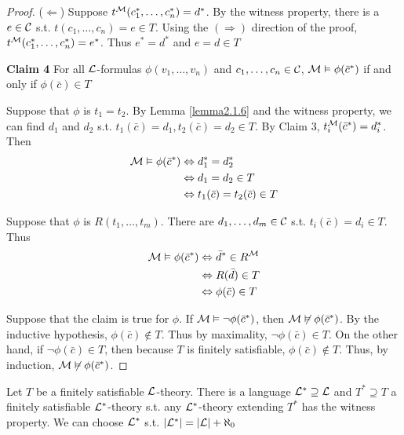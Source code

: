 \documentclass[11pt]{article}
\begin{document}
\begin{proof}
(\(\Leftarrow\)) Suppose \(t^{\mathcal{M}}(c_1^*,\dots,c_n^*)=d^*\). By the witness
property, there is a \(e\in\mathcal{C}\) s.t. \(t(c_1,\dots,c_n)=e\in T\). Using the
\((\Rightarrow)\) direction of the proof, \(t^{\mathcal{M}}(c_1^*,\dots,c_n^*)=e^*\).
Thus \(e^*=d^*\) and \(e=d\in T\)


\textbf{Claim 4} For all \(\mathcal{L}\)-formulas \(\phi(v_1,\dots,v_n)\) and
\(c_1,\dots,c_n\in\mathcal{C}\), \(\mathcal{M}\vDash\phi(\bar{c}^*)\) if and only if
\(\phi(\bar{c})\in T\)

Suppose that \(\phi\) is \(t_1=t_2\). By Lemma \ref{lemma2.1.6} and the
witness property, we can find \(d_1\) and \(d_2\) s.t. 
\(t_1(\bar{c})=d_1,t_2(\bar{c})=d_2\in T\). By Claim 3,
\(t_i^{\mathcal{M}}(\bar{c}^*)=d_i^*\). Then
\begin{align*}
\mathcal{M}\vDash\phi(\bar{c}^*)&\Leftrightarrow d_1^*=d_2^*\\
&\Leftrightarrow d_1=d_2\in T\\
&\Leftrightarrow t_1(\bar{c})=t_2(\bar{c})\in T
\end{align*}

Suppose that \(\phi\) is \(R(t_1,\dots,t_m)\). There are \(d_1,\dots,d_m\in\mathcal{C}\)
s.t. \(t_i(\bar{c})=d_i\in T\). Thus
\begin{align*}
\mathcal{M}\vDash\phi(\bar{c}^*)&\Leftrightarrow \bar{d}^*\in R^{\mathcal{M}}\\
&\Leftrightarrow R(\bar{d})\in T\\
&\Leftrightarrow\phi(\bar{c})\in T
\end{align*}

Suppose that the claim is true for \(\phi\). If
\(\mathcal{M}\vDash\neg\phi(\bar{c}^*)\), then
\(\mathcal{M}\not\vDash\phi(\bar{c}^*)\). By the inductive hypothesis,
\(\phi(\bar{c})\not\in T\). Thus by maximality, \(\neg\phi(\bar{c})\in T\). On
the other hand, if \(\neg\phi(\bar{c})\in T\), then because \(T\) is finitely
satisfiable, \(\phi(\bar{c})\not\in T\). Thus, by induction,
\(\mathcal{M}\not\vDash\phi(\bar{c}^*)\).
\end{proof}

\begin{lemma}[]
\label{lemma2.1.8}
Let \(T\) be a finitely satisfiable \(\mathcal{L}\)-theory. There is a language
\(\mathcal{L}^*\supseteq\mathcal{L}\) and \(T^*\supseteq T\) a finitely satisfiable
\(\mathcal{L}^*\)-theory s.t. any \(\mathcal{L}^*\)-theory extending \(T^*\) has the
witness property. We can choose \(\mathcal{L}^*\) s.t.
\(\abs{\call^*}=\abs{\call}+\aleph_0\) 
\end{lemma}
\end{document}
